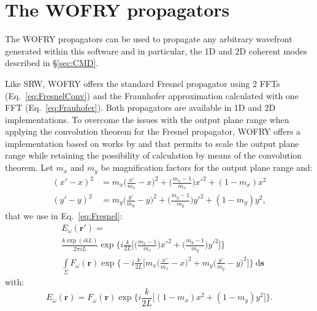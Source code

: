 \documentclass{iucr}              %
\begin{document}
\section{The WOFRY propagators}
\label{sec:appendixWOFRYpropagators}

The WOFRY propagators can be used to propagate any arbitrary wavefront generated within this software and in particular, the 1D and 2D coherent modes described in \S\ref{sec:CMD}. 

Like SRW, WOFRY offers the standard Fresnel propagator using 2 FFTs (Eq.~\ref{eq:FresnelConv}) and the Fraunhofer approximation calculated with one FFT (Eq.~\ref{eq:Frauhofer}). Both propagators are available in 1D and 2D implementations. To overcome the issues with the output plane range when applying the convolution theorem for the Fresnel propagator, WOFRY offers a implementation based on works by  and  that permits to scale the output plane range while retaining the possibility of calculation by means of the convolution theorem. Let $m_x$ and $m_y$ be magnification factors for the output plane range and:
\begin{equation}
\begin{split}
  (x'-x)^2 &= m_x\bigg(\frac{x'}{m_x}-x\bigg)^2+\bigg(\frac{m_x-1}{m_x}\bigg)x'^2+(1-m_x)x^2\\
  (y'-y)^2 &= m_y\bigg(\frac{y'}{m_y}-y\bigg)^2+\bigg(\frac{m_y-1}{m_y}\bigg)y'^2+(1-m_y)y^2,
\end{split}
\end{equation}
that we use in Eq.~\ref{eq:Fresnel}:
\begin{equation}\label{eq:ZoomFresnel}
\begin{split}
&E_\omega(\textbf{r}') =\\
&\frac{k\exp{(ikL)}}{2\pi i L}\exp{\bigg\{i\frac{k}{2L}\bigg[\bigg(\frac{m_x-1}{m_x}\bigg)x'^2 +\bigg(\frac{m_y-1}{m_y}\bigg)y'^2\bigg]\bigg\}}\\
&\int\limits_{\Sigma}{F_\omega(\textbf{r})\exp{\bigg\{-i \frac{k}{2 L}\bigg[m_x\bigg(\frac{x'}{m_x}-x\bigg)^2+ m_y\bigg(\frac{y'}{m_y}-y\bigg)^2\bigg]\bigg\}}~\mathrm{d}\textbf{s}
}
\end{split}
\end{equation}
with:
\begin{equation}\label{eq:E}
E_\omega(\textbf{r}) = F_\omega(\textbf{r}) \exp{\bigg\{i \frac{k}{2 L}\big[(1-m_x)x^2+(1-m_y)y^2 \big]\bigg\}}.
\end{equation}
\end{document}
